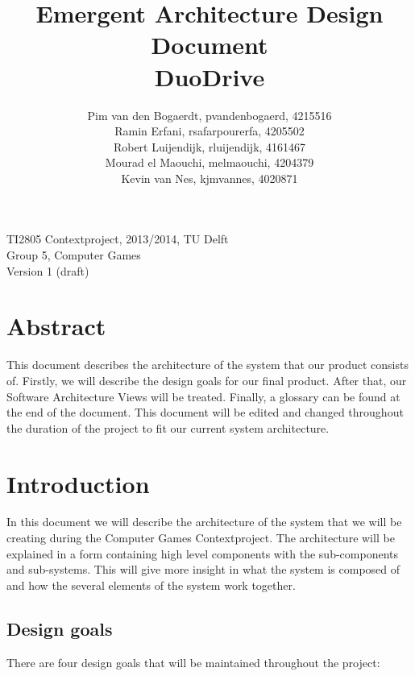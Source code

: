 \documentclass[11pt,twoside,a4paper]{article}
\title{
  Emergent Architecture Design Document\\
  DuoDrive
}
\author{
    Pim van den Bogaerdt, pvandenbogaerd, 4215516\\
    Ramin Erfani, rsafarpourerfa, 4205502\\
    Robert Luijendijk, rluijendijk, 4161467\\
    Mourad el Maouchi, melmaouchi, 4204379\\
    Kevin van Nes, kjmvannes, 4020871
}
\begin{document}
\maketitle
\begin{center}
TI2805 Contextproject, 2013/2014, TU Delft\\
Group 5, Computer Games\\
Version 1 (draft)
\end{center}
\clearpage


\section*{Abstract}
This document describes the architecture of the system that our product consists of. Firstly, we will describe the design goals for our final product. After that, our Software Architecture Views will be treated. Finally, a glossary can be found at the end of the document. This document will be edited and changed throughout the duration of the project to fit our current system architecture.


\clearpage
\tableofcontents

\clearpage


\section{Introduction}
In this document we will describe the architecture of the system that we will be creating during the Computer Games Contextproject. The architecture will be explained in a form containing high level components with the sub-components and sub-systems. This will give more insight in what the system is composed of and how the several elements of the system work together. 


\subsection{Design goals}
There are four design goals that will be maintained throughout the project:
\end{document}
